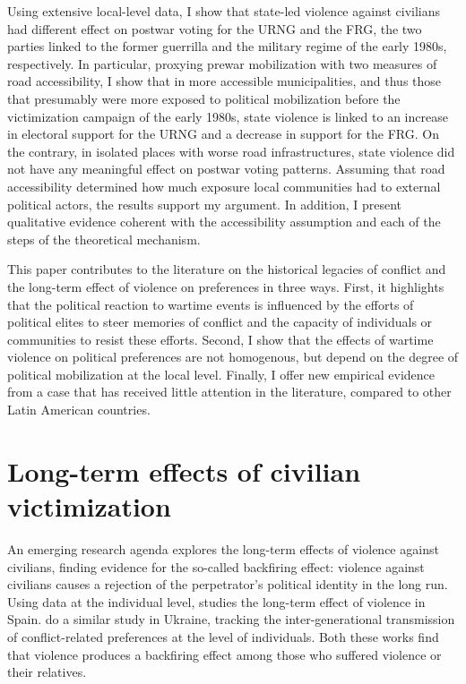 \documentclass[12pt, notitlepage]{article}
\begin{document}
Using extensive local-level data, I show that state-led violence against civilians had different effect on postwar voting for the URNG and the FRG, the two parties linked to the former guerrilla and the military regime of the early 1980s, respectively.
In particular, proxying prewar mobilization with two measures of road accessibility, I show that in more accessible municipalities, and thus those that presumably were more exposed to political mobilization before the victimization campaign of the early 1980s, state violence is linked to an increase in electoral support for the URNG and a decrease in support for the FRG.
On the contrary, in isolated places with worse road infrastructures, state violence did not have any meaningful effect on postwar voting patterns.
Assuming that road accessibility determined how much exposure local communities had to external political actors, the results support my argument.
In addition, I present qualitative evidence coherent with the accessibility assumption and each of the steps of the theoretical mechanism.

This paper contributes to the literature on the historical legacies of conflict \citep{Daly:2012aa, Weintraub:2015aa, Osorio:2018aa, Zhukov:2018aa} and the long-term effect of violence on preferences \citep{Balcells:2012aa, Lupu:2017aa, Fontana:2017aa, Rozenas:2017aa, Rozenas:2019aa} in three ways.
First, it highlights that the political reaction to wartime events is influenced by the efforts of political elites to steer memories of conflict and the capacity of individuals or communities to resist these efforts.
Second, I show that the effects of wartime violence on political preferences are not homogenous, but depend on the degree of political mobilization at the local level.
Finally, I offer new empirical evidence from a case that has received little attention in the literature, compared to other Latin American countries.

\section*{Long-term effects of civilian victimization}

An emerging research agenda explores the long-term effects of violence against civilians, finding evidence for the so-called backfiring effect: violence against civilians causes a rejection of the perpetrator's political identity in the long run.
Using data at the individual level, \citet{Balcells:2012aa} studies the long-term effect of violence in Spain.
\citet{Lupu:2017aa} do a similar study in Ukraine, tracking the inter-generational transmission of conflict-related preferences at the level of individuals.
Both these works find that violence produces a backfiring effect among those who suffered violence or their relatives.
\end{document}
